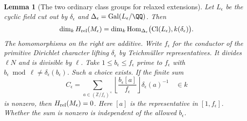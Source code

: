 \documentclass[a4paper,11pt]{article}
\newtheorem{lemma}[proposition]{Lemma}
\theoremstyle{definition}
\theoremstyle{remark}
\newcommand{\ZZ}{\mathbb Z}\newcommand{\ord}{\operatorname{ord}}
\numberwithin{equation}{section}
\newcommand{\Cl}{\operatorname{Cl}}
\begin{document}
\begin{lemma}[The two ordinary class groups for relaxed extensions]
\leavevmode\label{lem:reflectedrel565}
Let \(L_\epsilon\) be the cyclic field cut out by \(\delta_\epsilon\)
and \(\Delta_\epsilon=\operatorname{Gal}(L_\epsilon/\QQ)\).
Then
\[
 \dim_k H_{\rm rel}(M_\epsilon)
   =\dim_k \operatorname{Hom}_{\Delta_\epsilon}
          \bigl(\Cl(L_\epsilon),k(\delta_\epsilon)\bigr).
\]
The homomorphisms on the right are additive.
Write \(f_\epsilon\) for the conductor of the primitive Dirichlet
character lifting \(\delta_\epsilon\) by Teichm\"uller representatives.
It divides \(\ell N\) and is divisible by \(\ell\).
Take \(1\le b_\epsilon\le f_\epsilon\) prime to \(f_\epsilon\)
with \(b_\epsilon\bmod\ell\ne\delta_\epsilon(b_\epsilon)\).
Such a choice exists. If the finite sum
\[
 C_\epsilon=\sum_{a\in(\ZZ/f_\epsilon)^\times}
        \left\lfloor\frac{b_\epsilon[a]}{f_\epsilon}\right\rfloor
                         \delta_\epsilon(a)^{-1}\quad\in k
\]
is nonzero, then \(H_{\rm rel}(M_\epsilon)=0\). Here \([a]\)
is the representative in \([1,f_\epsilon]\). Whether the sum
is nonzero is independent of the allowed \(b_\epsilon\).
\end{lemma}
\end{document}
